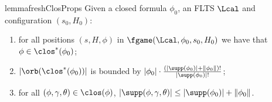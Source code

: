 \begin{restatable}{lemma}{freshClosProps}\label{lem:freshClosProps}
Given a closed formula $\phi_0$, an FLTS $\Lcal$ and configuration $(s_0,H_0)$:
    \begin{enumerate}
        \item\label{lem:freshClosProps:2} for all positions $(s,H,\phi)$ in $\fgame(\Lcal,\phi_0, s_0,H_0)$ we have that $\phi\in\clos^*(\phi_0)$; 
        \item\label{lem:freshClosProps:3} $|\orb(\clos^*(\phi_0))|$ is bounded by $|\phi_0|\cdot \frac{(|\supp(\phi_0)| + \|\phi_0\|)!}{|\supp(\phi_0)|!}$;
\item\label{lem:freshClosProps:4} for all $(\phi,\gamma,\theta)\in\clos(\phi)$, $|\supp(\phi,\gamma,\theta)| \le |\supp(\phi_0)| + \|\phi_0\|$. 
    \end{enumerate}
\end{restatable}



